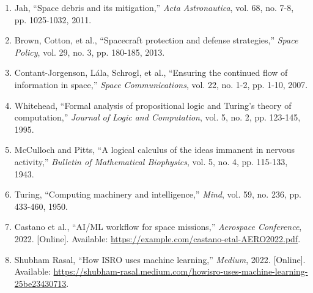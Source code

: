 \documentclass[a4paper,12pt]{article}
\begin{document}
\begin{enumerate}
    \item Jah, “Space debris and its mitigation,” \textit{Acta Astronautica}, vol. 68, no. 7-8, pp. 1025-1032, 2011.
    
    \item Brown, Cotton, et al., “Spacecraft protection and defense strategies,” \textit{Space Policy}, vol. 29, no. 3, pp. 180-185, 2013.
    
    \item Contant-Jorgenson, Lála, Schrogl, et al., “Ensuring the continued flow of information in space,” \textit{Space Communications}, vol. 22, no. 1-2, pp. 1-10, 2007.
    
    \item Whitehead, “Formal analysis of propositional logic and Turing’s theory of computation,” \textit{Journal of Logic and Computation}, vol. 5, no. 2, pp. 123-145, 1995.
    
    \item McCulloch and Pitts, “A logical calculus of the ideas immanent in nervous activity,” \textit{Bulletin of Mathematical Biophysics}, vol. 5, no. 4, pp. 115-133, 1943.
    
    \item Turing, “Computing machinery and intelligence,” \textit{Mind}, vol. 59, no. 236, pp. 433-460, 1950.
    
    \item Castano et al., “AI/ML workflow for space missions,” \textit{Aerospace Conference}, 2022. [Online]. Available: \url{https://example.com/castano-etal-AERO2022.pdf}.
    
    \item Shubham Rasal, “How ISRO uses machine learning,” \textit{Medium}, 2022. [Online]. Available: \url{https://shubham-rasal.medium.com/howisro-uses-machine-learning-25be23430713}.
\end{enumerate}
\end{document}
